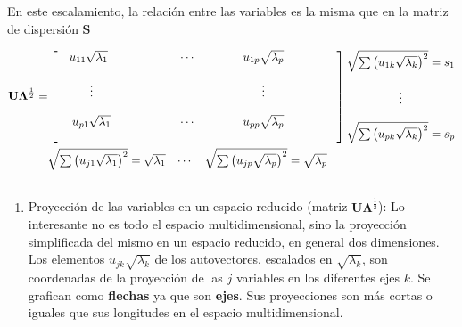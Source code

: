 \documentclass[]{book}
\providecommand{\tightlist}{%
  \setlength{\itemsep}{0pt}\setlength{\parskip}{0pt}}
\theoremstyle{definition}
\theoremstyle{definition}
\theoremstyle{definition}
\theoremstyle{remark}
\begin{document}
En este escalamiento, la relación entre las variables es la misma que en
la matriz de dispersión \(\mathbf{S}\)

\[
\begin{aligned}
  {\mathbf{U}\mathbf{\Lambda}^{\frac{1}{2}}} = 
    &\begin{bmatrix}
      \hphantom{00}u_{11}\sqrt{\lambda_{1}}\hphantom{0000000} & \hphantom{000}\cdots & \hphantom{000000}u_{1p}\sqrt{\lambda_{p}}\hphantom{000000000} \\\\
      \vdots\hphantom{0000} & \  & \hphantom{00000}\vdots\hphantom{00000000} \\\\
      u_{p1}\sqrt{\lambda_{1}}\hphantom{0000} & \hphantom{000}\cdots & \hphantom{000000}u_{pp}\sqrt{\lambda_{p}}\hphantom{000000000} \\
    &\end{bmatrix}
    \begin{matrix}
      \sqrt{\sum\left( u_{1k}\sqrt{\lambda_{k}} \right)^{2}} = s_{1} \\
      \\
      \vdots \\
      \\
      \sqrt{\sum\left( u_{pk}\sqrt{\lambda_{k}} \right)^{2}} = s_{p} \\
    \end{matrix} \\
    &\begin{matrix}
      \sqrt{\sum\left( u_{j1}\sqrt{\lambda_{1}} \right)^{2}} = \sqrt{\lambda_{1}} & \cdots & \sqrt{\sum\left( u_{jp}\sqrt{\lambda_{p}} \right)^{2}} = \sqrt{\lambda_{p}} \\
    &\end{matrix} \\
\end{aligned}
\]

\begin{enumerate}
\def\labelenumi{\arabic{enumi}.}
\tightlist
\item
  Proyección de las variables en un espacio reducido (matriz
  \(\mathbf{U}\mathbf{\Lambda}^{\frac{1}{2}}\)): Lo interesante no es
  todo el espacio multidimensional, sino la proyección simplificada del
  mismo en un espacio reducido, en general dos dimensiones. Los
  elementos \(u_{jk}\sqrt{\lambda_{k}}\) de los autovectores, escalados
  en \(\sqrt{\lambda_{k}}\), son coordenadas de la proyección de las
  \(j\) variables en los diferentes ejes \(k\). Se grafican como
  \textbf{flechas} ya que son \textbf{ejes}. Sus proyecciones son más
  cortas o iguales que sus longitudes en el espacio multidimensional.
\end{enumerate}
\end{document}
